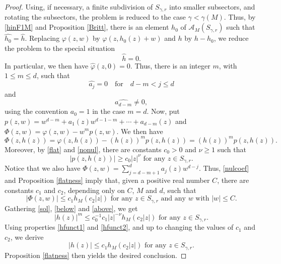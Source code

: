 \documentclass[a4paper]{amsart}
\theoremstyle{plain}
\theoremstyle{remark}
\begin{document}
\begin{proof}
Using, if necessary, a finite subdivision of $ S_{\gamma,r} $ into smaller subsectors, and rotating the subsectors, the problem is reduced to the case $\gamma<\gamma(M) $. Thus, by \eqref{hinF1M} and Proposition \ref{Britt}, there is an element $ h_0 $ of $ \mathcal{A}_M(S_{\gamma,r}) $ such that $ \widehat{h_0}=\widehat{h} $. Replacing $ \varphi(z,w) $ by $\varphi(z,h_0(z)+w) $ and $ h $ by $ h-h_0 $, we reduce the problem to the special situation 
\begin{equation}\label{flat} 
\widehat{h}=0.
\end{equation}
In particular, we then have $ \widehat{\varphi}(z,0)=0 $. Thus, there is an integer $ m $, with $ 1\leq m\leq d $, such that
\begin{equation}\label{nulcoef}
\widehat{a_j}=0 \quad\text{for}\quad d-m<j\leq d
\end{equation}
and
\begin{equation}\label{nonul}
\widehat{a_{d-m}}\neq 0, 
\end{equation}
using the convention $ a_0=1 $ in the case $ m=d $. Now, put $ p(z,w)=w^{d-m}+{a_1}(z)w^{d-1-m}+\cdots+{a_{d-m}}(z) $ and $ \Phi(z,w)=\varphi(z,w)-w^mp(z,w) $. 
We then have
\begin{equation}\label{sol}
\Phi(z,h(z))=\varphi(z,h(z))-(h(z))^mp(z,h(z))=(h(z))^m p(z,h(z)). 
\end{equation}
Moreover, by \eqref{flat} and \eqref{nonul}, there are constants $ c_0>0 $ and $ \nu\geq 1 $ such that
\begin{equation}\label{below}
\vert p(z,h(z))\vert\geq c_0\vert z\vert^\nu \text{ for any } z\in S_{\gamma,r}.
\end{equation}
Notice that we also have
$ \Phi(z,w)=\sum_{j=d-m+1}^da_j(z)w^{d-j}. $ Thus, \eqref{nulcoef} and Proposition \ref{flatness} imply that, given a positive real number $ C $, there are constants $ c_1 $ and $ c_2 $, depending only on $C $, $ M $ and $ d $, such that  
\begin{equation}\label{above}
\vert \Phi(z,w)\vert\leq c_1 h_M(c_2\vert z\vert)\text{ for any }z\in S_{\gamma,r}\text{ and any } w \text{ with } \vert w\vert\leq C.
\end{equation}
Gathering \eqref{sol}, \eqref{below} and \eqref{above}, we get
\begin{equation}\label{fin1}
\vert h(z)\vert^m\leq c_0^{-1}c_1\vert z\vert^{-\nu}h_M(c_2\vert z\vert)\text{ for any } z\in S_{\gamma,r}.
\end{equation}
Using properties \eqref{hfunct1} and \eqref{hfunct2}, and up to changing the values of $ c_1 $ and $ c_2 $, we derive
\begin{equation}\label{fin2}
\vert h(z)\vert\leq c_1 h_M(c_2\vert z\vert)\text{ for any } z\in S_{\gamma,r}.
\end{equation}
Proposition \ref{flatness} then yields the desired conclusion.
\end{proof}
\end{document}
